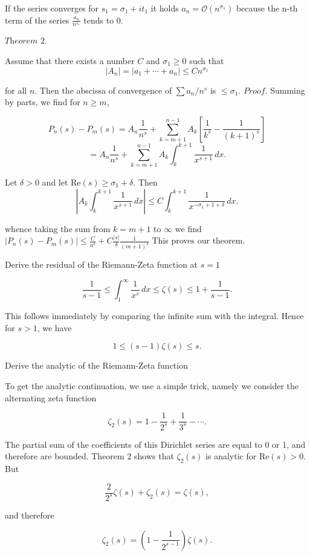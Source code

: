 If the series converges for \( s_1 = \sigma_1 + i t_1 \) it holds
\( a_n = \mathcal{O}(n^{\sigma_1}) \) because the n-th term of the series \( \frac{a_n}{n^{s_1}} \) tends to \( 0 \).

\( \textit{Theorem 2.} \) 

Assume that there exists a number \( C \) and \(\sigma_1 \geq 0 \) such that
\[
|A_n| = |a_1 + \cdots + a_n| \leq C n^{\sigma_1}
\]

for all \( n \). 
Then the abscissa of convergence of \(\sum a_n / n^s\) is \(\leq \sigma_1\).
\( \textit{Proof.} \) Summing by parts, we find for \( n \geq m \),

\[
P_n(s) - P_m(s) = A_n \frac{1}{n^s} + \sum_{k=m+1}^{n-1} A_k \left[ \frac{1}{k^s} - \frac{1}{(k+1)^s} \right]
\]
\[
= A_n \frac{1}{n^s} + \sum_{k=m+1}^{n-1} A_k \int_k^{k+1} \frac{1}{x^{s+1}} \, dx.
\]

Let \( \delta > 0 \) and let \(\text{Re}(s) \geq \sigma_1 + \delta\). Then
\[
\left| A_k \int_k^{k+1} \frac{1}{x^{s+1}} \, dx \right| \leq C \int_k^{k+1} \frac{1}{x^{-\sigma_1+1+\delta}} \, dx.
\]

whence taking the sum from \( k = m + 1 \) to \( \infty \) we find
\( |P_n(s) - P_m(s)| \leq \frac{C}{n^{\delta}} + C \frac{|s|}{\delta}\frac{1}{(m+1)^{\delta}} \)
This proves our theorem.


Derive the residual of the Riemann-Zeta function at \(s = 1\)


\[
\frac{1}{s-1} \leq \int_1^\infty \frac{1}{x^s} \, dx \leq \zeta(s) \leq 1 + \frac{1}{s-1}.
\]

This follows immediately by comparing the infinite sum with the integral. Hence for \( s > 1 \), we have

\[
1 \leq (s-1) \zeta(s) \leq s.
\]


Derive the analytic of the Riemann-Zeta function

To get the analytic continuation, we use a simple trick, namely we consider the alternating zeta function

\[
\zeta_2(s) = 1 - \frac{1}{2^s} + \frac{1}{3^s} - \cdots.
\]

The partial sum of the coefficients of this Dirichlet series are equal to 0 or 1, and therefore are bounded. 
Theorem 2 shows that \(\zeta_2(s)\) is analytic for \(\text{Re}(s) > 0\). But

\[
\frac{2}{2^s} \zeta(s) + \zeta_2(s) = \zeta(s),
\]

and therefore

\[
\zeta_2(s) = \left(1 - \frac{1}{2^{s-1}}\right) \zeta(s).
\]

